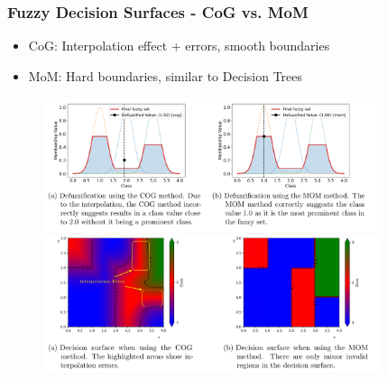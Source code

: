 \documentclass[
	10pt,
	t		%
]{beamer}
\begin{document}
\begin{frame}

	\frametitle{Fuzzy Decision Surfaces - CoG vs. MoM}

	\begin{itemize}
		\item CoG: Interpolation effect + errors, smooth boundaries
		\item MoM: Hard boundaries, similar to Decision Trees
	\end{itemize}

	\begin{figure}
		\centering
		\includegraphics[width=0.87\textwidth, trim={0 4.8cm 0 0cm},clip]{figures/cog-vs-mom.png}

		\includegraphics[width=0.88\textwidth, trim={0 3.8cm 0 0cm},clip]{figures/decision-surfaces.png}
	\end{figure}


\end{frame}
\end{document}
